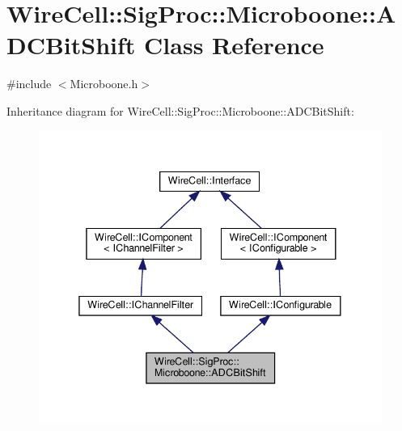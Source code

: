 \hypertarget{class_wire_cell_1_1_sig_proc_1_1_microboone_1_1_a_d_c_bit_shift}{}\section{Wire\+Cell\+:\+:Sig\+Proc\+:\+:Microboone\+:\+:A\+D\+C\+Bit\+Shift Class Reference}
\label{class_wire_cell_1_1_sig_proc_1_1_microboone_1_1_a_d_c_bit_shift}


{\ttfamily \#include $<$Microboone.\+h$>$}



Inheritance diagram for Wire\+Cell\+:\+:Sig\+Proc\+:\+:Microboone\+:\+:A\+D\+C\+Bit\+Shift\+:
\nopagebreak
\begin{figure}[H]
\begin{center}
\leavevmode
\includegraphics[width=338pt]{class_wire_cell_1_1_sig_proc_1_1_microboone_1_1_a_d_c_bit_shift__inherit__graph}
\end{center}
\end{figure}


